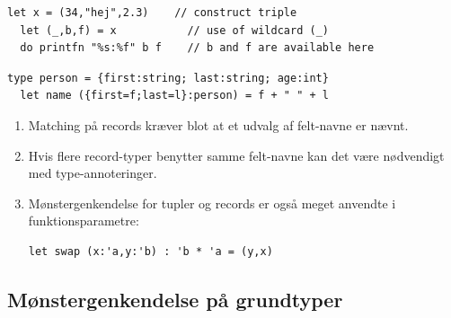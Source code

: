 \documentclass[rgb]{beamer}
\begin{document}
\begin{frame}[fragile]
\begin{footnotesize}


    \vspace{1ex}

\begin{lstlisting}[numbers=none,frame=none,mathescape]
  let x = (34,"hej",2.3)    // construct triple
  let (_,b,f) = x           // use of wildcard (_)
  do printfn "%s:%f" b f    // b and f are available here
\end{lstlisting}

    \vspace{1ex}


\begin{lstlisting}[numbers=none,frame=none,mathescape]
  type person = {first:string; last:string; age:int}
  let name ({first=f;last=l}:person) = f + " " + l
\end{lstlisting}

  \vspace{1ex}

  \begin{enumerate}
  \item Matching på records kræver blot at et udvalg af felt-navne er nævnt.
  \item Hvis flere record-typer benytter samme felt-navne kan det være nødvendigt med type-annoteringer.
  \item Mønstergenkendelse for tupler og records er også meget anvendte i funktionsparametre:
\begin{lstlisting}[numbers=none,frame=none,mathescape]
  let swap (x:'a,y:'b) : 'b * 'a = (y,x)
\end{lstlisting}
  \end{enumerate}

\end{footnotesize}
\end{frame}

\subsection{Mønstergenkendelse på grundtyper}
\end{document}
